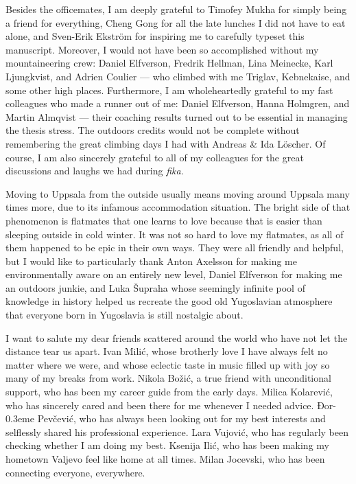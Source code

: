 \documentclass{UUThesisTemplate}
\newcommand*\strike[1]{\bibnamefont{#1}\kern-0.3em{\raisebox{0.75ex}{-}}}
\begin{document}
{\par
Besides the officemates, I am deeply grateful to Timofey Mukha for simply being a friend for everything, Cheng Gong for all the late lunches I did not have to eat alone, and Sven-Erik Ekström for inspiring me to carefully typeset this manuscript. Moreover, I would not have been so accomplished without my mountaineering crew: Daniel Elfverson, Fredrik Hellman, Lina Meinecke, Karl Ljungkvist, and Adrien Coulier --- who climbed with me Triglav, Kebnekaise, and some other high places. Furthermore, I am wholeheartedly grateful to my fast colleagues who made a runner out of me: Daniel Elfverson, Hanna Holmgren, and Martin Almqvist --- their coaching results turned out to be essential in managing the thesis stress. The outdoors credits would not be complete without remembering the great climbing days I had with Andreas \& Ida Löscher. Of course, I am also sincerely grateful to all of my colleagues for the great discussions and laughs we had during \emph{fika}. 

\par
Moving to Uppsala from the outside usually means moving around Uppsala many times more, due to its infamous accommodation situation. The bright side of that phenomenon is flatmates that one learns to love because that is easier than sleeping outside in cold winter. It was not so hard to love my flatmates, as all of them happened to be epic in their own ways. They were all friendly and helpful, but I would like to particularly thank Anton Axelsson for making me environmentally aware on an entirely new level, Daniel Elfverson for making me an outdoors junkie, and Luka Šupraha whose seemingly infinite pool of knowledge in history helped us recreate the good old Yugoslavian atmosphere that everyone born in Yugoslavia is still nostalgic about.

\par
I want to salute my dear friends scattered around the world who have not let the distance tear us apart. Ivan Milić, whose brotherly love I have always felt no matter where we were, and whose eclectic taste in music filled up with joy so many of my breaks from work. Nikola Božić, a true friend with unconditional support, who has been my career guide from the early days. Milica Kolarević, who has sincerely cared and been there for me whenever I needed advice. Đor\strike{d}e Pevčević, who has always been looking out for my best interests and selflessly shared his professional experience. Lara Vujović, who has regularly been checking whether I am doing my best. Ksenija Ilić, who has been making my hometown Valjevo feel like home at all times. Milan Jocevski, who has been connecting everyone, everywhere.

}
\end{document}

